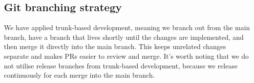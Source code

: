 \subsection{Git branching strategy}
We have applied trunk-based development, meaning we branch out from the main branch, have a branch that lives shortly until the changes are implemented, and then merge it directly into the main branch. This keeps unrelated changes separate and makes PRs easier to review and merge. It's worth noting that we do not utilise release branches from trunk-based development, because we release continuously for each merge into the main branch.
